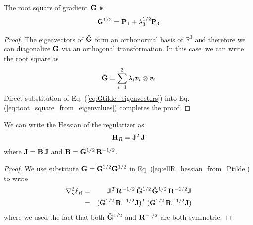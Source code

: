 
\begin{theorem}
The root square of gradient $\tilde{{\mathbf{G}}}$ is 
\begin{equation}
	\tilde{{\mathbf{G}}}^{1/2} = {\mathbf{P}}_1 + \lambda_3^{1/2}{\mathbf{P}}_3
\end{equation}
\end{theorem}
\begin{proof}
The eigenvectors of $\tilde{{\mathbf{G}}}$ form an orthonormal basis of $\mathbb{R}^3$ and
therefore we can diagonalize $\tilde{{\mathbf{G}}}$ via an orthogonal transformation. In
this case, we can write the root square as
\begin{equation}
	\sGtilde = \sum_{i=1}^{3} \lambda_i\vf{v}_i\otimes\vf{v}_i
	\label{eq:toot_square_from_eigenvalues}
\end{equation}
Direct substitution of Eq. (\ref{eq:Gtilde_eigenvectors}) into Eq.
(\ref{eq:toot_square_from_eigenvalues}) completes the proof.
\end{proof}




\begin{theorem}
We can write the Hessian of the regularizer as
\begin{equation}
	{\mathbf{H}}_R=\bar{{\mathbf{J}}}^T\bar{{\mathbf{J}}}
\end{equation}
where $\bar{{\mathbf{J}}}={\mathbf{B}}\,{\mathbf{J}}$ and ${\mathbf{B}} = \tilde{{\mathbf{G}}}^{1/2}\,{\mathbf{R}}^{-1/2}$.
\end{theorem} 
\begin{proof}
We use substitute $\tilde{{\mathbf{G}}}=\tilde{{\mathbf{G}}}^{1/2}\tilde{{\mathbf{G}}}^{1/2}$ in Eq.
(\ref{eq:ellR_hessian_from_Ptilde}) to write
\begin{eqnarray}
	\nabla_{\mathbf{v}}^2\ell_R &=&
	{\mathbf{J}}^T{\mathbf{R}}^{-1/2}\,\tilde{{\mathbf{G}}}^{1/2}\,\tilde{{\mathbf{G}}}^{1/2}\,{\mathbf{R}}^{-1/2}{\mathbf{J}}\nonumber\\
	&=& (\tilde{{\mathbf{G}}}^{1/2}\,{\mathbf{R}}^{-1/2}{\mathbf{J}})^T\,(\tilde{{\mathbf{G}}}^{1/2}\,{\mathbf{R}}^{-1/2}{\mathbf{J}})
\end{eqnarray}
where we used the fact that both $\tilde{{\mathbf{G}}}^{1/2}$ and ${\mathbf{R}}^{-1/2}$ are both
symmetric.
\end{proof}

